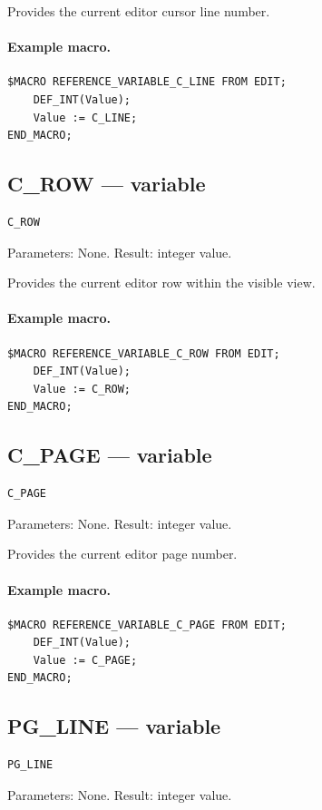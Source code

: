 \documentclass[a4paper,10pt,twoside,openany]{book}
\begin{document}
Provides the current editor cursor line number.

\paragraph{Example macro.}
\begin{verbatim}
$MACRO REFERENCE_VARIABLE_C_LINE FROM EDIT;
    DEF_INT(Value);
    Value := C_LINE;
END_MACRO;
\end{verbatim}

\label{prim:variable-c-row}
\subsection*{C\_ROW --- variable}
\begin{verbatim}
C_ROW
\end{verbatim}
Parameters: None. Result: integer value.

Provides the current editor row within the visible view.

\paragraph{Example macro.}
\begin{verbatim}
$MACRO REFERENCE_VARIABLE_C_ROW FROM EDIT;
    DEF_INT(Value);
    Value := C_ROW;
END_MACRO;
\end{verbatim}

\label{prim:variable-c-page}
\subsection*{C\_PAGE --- variable}
\begin{verbatim}
C_PAGE
\end{verbatim}
Parameters: None. Result: integer value.

Provides the current editor page number.

\paragraph{Example macro.}
\begin{verbatim}
$MACRO REFERENCE_VARIABLE_C_PAGE FROM EDIT;
    DEF_INT(Value);
    Value := C_PAGE;
END_MACRO;
\end{verbatim}

\label{prim:variable-pg-line}
\subsection*{PG\_LINE --- variable}
\begin{verbatim}
PG_LINE
\end{verbatim}
Parameters: None. Result: integer value.
\end{document}
